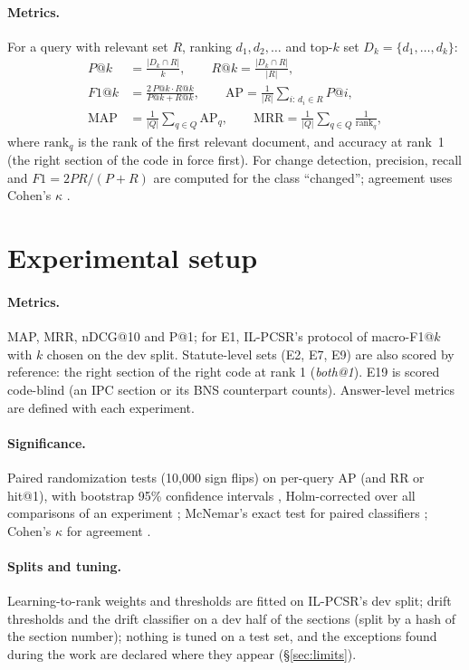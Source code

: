 \documentclass[sigconf,nonacm]{acmart}
\begin{document}
\paragraph{Metrics.} For a query with relevant set $R$, ranking $d_1,d_2,\dots$ and top-$k$ set
$D_k=\{d_1,\dots,d_k\}$:
\begin{align*}
P@k &= \frac{|D_k\cap R|}{k}, \qquad R@k = \frac{|D_k\cap R|}{|R|},\\
F1@k &= \frac{2\,P@k\cdot R@k}{P@k+R@k}, \qquad \mathrm{AP} = \frac{1}{|R|}\sum_{i:\,d_i\in R} P@i,\\
\mathrm{MAP} &= \frac{1}{|Q|}\sum_{q\in Q}\mathrm{AP}_q, \qquad \mathrm{MRR}=\frac{1}{|Q|}\sum_{q\in Q}\frac{1}{\mathrm{rank}_q},
\end{align*}
where $\mathrm{rank}_q$ is the rank of the first relevant document, and accuracy at rank~1 (the
right section of the code in force first). For change detection, precision, recall and
$F1=2PR/(P+R)$ are computed for the class ``changed''; agreement uses Cohen's $\kappa$
\cite{cohen1960}.

\section{Experimental setup}\label{sec:setup}

\paragraph{Metrics.} MAP, MRR, nDCG@10 and P@1; for E1, IL-PCSR's protocol of macro-F1@$k$ with $k$
chosen on the dev split. Statute-level sets (E2, E7, E9) are also scored by reference: the right
section of the right code at rank 1 (\emph{both@1}). E19 is scored code-blind (an IPC section or its
BNS counterpart counts). Answer-level metrics are defined with each experiment.
\paragraph{Significance.} Paired randomization tests (10,000 sign flips) on per-query AP (and RR or
hit@1), with bootstrap 95\% confidence intervals \cite{smucker2007}, Holm-corrected over all
comparisons of an experiment \cite{holm1979}; McNemar's exact test for paired classifiers
\cite{dietterich1998}; Cohen's $\kappa$ for agreement \cite{cohen1960}.
\paragraph{Splits and tuning.} Learning-to-rank weights and thresholds are fitted on IL-PCSR's dev
split; drift thresholds and the drift classifier on a dev half of the sections (split by a hash of
the section number); nothing is tuned on a test set, and the exceptions found during the work are
declared where they appear (\S\ref{sec:limits}).
\end{document}
